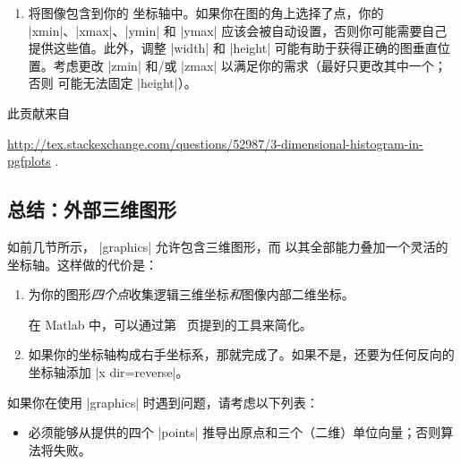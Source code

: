 {{\begin{enumerate}
\begin{codeexample}
print -dpdf matlabout      %
\end{codeexample}
    \item 将图像包含到你的 \PGFPlots{} 坐标轴中。如果你在图的角上选择了点，你的 |xmin|、|xmax|、|ymin| 和 |ymax| 应该会被自动设置，否则你可能需要自己提供这些值。此外，调整 |width| 和 |height| 可能有助于获得正确的图垂直位置。考虑更改 |zmin| 和/或 |zmax| 以满足你的需求（最好只更改其中一个；否则 \PGFPlots{} 可能无法固定 |height|）。
\end{enumerate}

此贡献来自

\noindent
\url{http://tex.stackexchange.com/questions/52987/3-dimensional-histogram-in-pgfplots} .


\subsection*{总结：外部三维图形}

如前几节所示， |graphics| 允许包含三维图形，而 \PGFPlots{} 以其全部能力叠加一个灵活的坐标轴。这样做的代价是：
%
\begin{enumerate}
    \item 为你的图形\emph{四个点}收集逻辑三维坐标\emph{和}图像内部二维坐标。

        在 Matlab 中，可以通过第~\pageref{sec:plotgraphics3d:matlabscript} 页提到的工具来简化。
    \item 如果你的坐标轴构成右手坐标系，那就完成了。如果不是，还要为任何反向的坐标轴添加 |x dir=reverse|。
\end{enumerate}

\noindent 如果你在使用  |graphics| 时遇到问题，请考虑以下列表：
%
\begin{itemize}
    \item 必须能够从提供的四个 |points| 推导出原点和三个（二维）单位向量；否则算法将失败。


\end{itemize}}}
